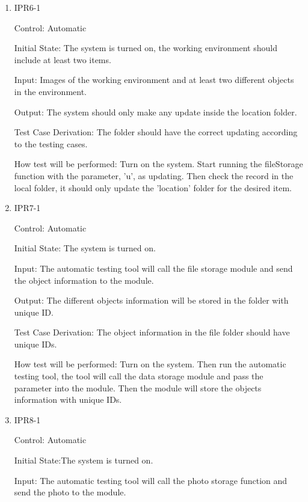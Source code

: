 \documentclass[12pt, titlepage]{article}
\begin{document}
\begin{enumerate}

\item{IPR6-1\\}

Control: Automatic
					
Initial State: The system is turned on, the working environment should include at least two items.
					
Input: Images of the working environment and at least two different objects in the environment. 
					
Output: The system should only make any update inside the location folder.

Test Case Derivation: The folder should have the correct updating according to the testing cases.
					
How test will be performed: Turn on the system. Start running the fileStorage function with the parameter, 'u', as updating. Then check the record in the local folder, it should only update the 'location' folder for the desired item.

				


\item{IPR7-1\\}

Control: Automatic
					
Initial State: The system is turned on.
					
Input: The automatic testing tool will call the file storage module and send the object information to the module. 
					
Output: The different objects information will be stored in the folder with unique ID.

Test Case Derivation: The object information in the file folder should have unique IDs.
					
How test will be performed:
Turn on the system. Then run the automatic testing tool, the tool will call the data storage module and pass the parameter into the module. Then the module will store the objects information with unique IDs.


\item{IPR8-1\\}

Control: Automatic
					
Initial State:The system is turned on.
					
Input: The automatic testing tool will call the photo storage function and send the photo to the module. 
					

\end{enumerate}
\end{document}

